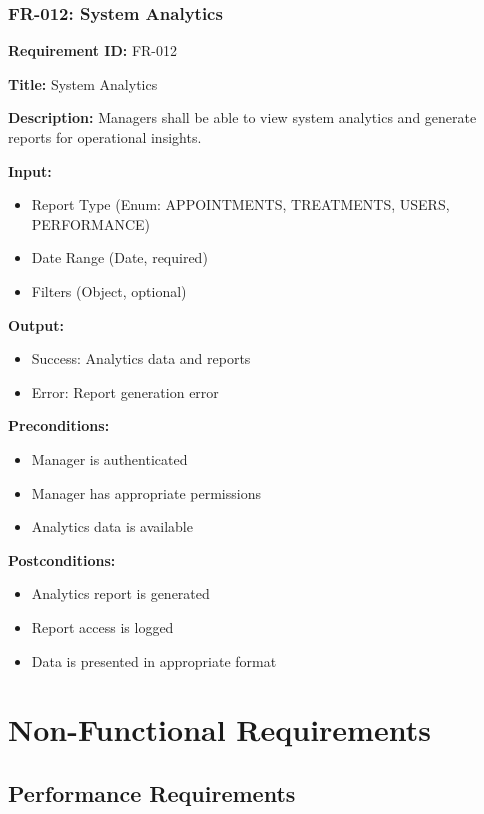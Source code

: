 \documentclass[12pt,a4paper]{article}
\begin{document}
\subsubsection{FR-012: System Analytics}

\textbf{Requirement ID:} FR-012

\textbf{Title:} System Analytics

\textbf{Description:} Managers shall be able to view system analytics and generate reports for operational insights.

\textbf{Input:}
\begin{itemize}
    \item Report Type (Enum: APPOINTMENTS, TREATMENTS, USERS, PERFORMANCE)
    \item Date Range (Date, required)
    \item Filters (Object, optional)
\end{itemize}

\textbf{Output:}
\begin{itemize}
    \item Success: Analytics data and reports
    \item Error: Report generation error
\end{itemize}

\textbf{Preconditions:}
\begin{itemize}
    \item Manager is authenticated
    \item Manager has appropriate permissions
    \item Analytics data is available
\end{itemize}

\textbf{Postconditions:}
\begin{itemize}
    \item Analytics report is generated
    \item Report access is logged
    \item Data is presented in appropriate format
\end{itemize}

\section{Non-Functional Requirements}

\subsection{Performance Requirements}
\end{document}
